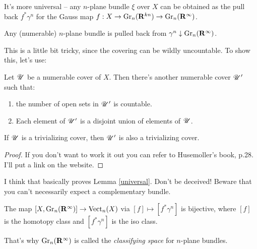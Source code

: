 It's more universal -- any $n$-plane bundle $\xi$ over $X$ can be obtained as the pull back $f^\ast\gamma^n$ for the Gauss map $f:X\to\mathrm{Gr}_n(\mathbf R^{kn})\to\mathrm{Gr}_n(\mathbf R^\infty)$.
\begin{lemma}\label{universal}
    Any (numerable) $n$-plane bundle is pulled back from $\gamma^n\downarrow \mathrm{Gr}_n(\mathbf R^\infty)$.
\end{lemma}
This is a little bit tricky, since the covering can be wildly uncountable. To show this, let's use:
\begin{lemma}\label{sublemma}
    Let $\mathscr U$ be a numerable cover of $X$. Then there's another numerable cover $\mathscr U^\prime$ such that:
    \begin{enumerate}
	\item the number of open sets in $\mathscr U^\prime$ is countable.
	\item Each element of $\mathscr U^\prime$ is a disjoint union of elements of $\mathscr U$.
    \end{enumerate}
\end{lemma}
If $\mathscr U$ is a trivializing cover, then $\mathscr U^\prime$ is also a trivializing cover.
\begin{proof}
    If you don't want to work it out you can refer to Husemoller's book, p.28. I'll put a link on the website.
\end{proof}
I think that basically proves Lemma \ref{universal}. Don't be deceived! Beware that you can't necessarily expect a complementary bundle.
\begin{theorem}
    The map $[X,\mathrm{Gr}_n(\mathbf R^\infty)]\to \operatorname{Vect}_n(X)$ via $[f]\mapsto [f^\ast\gamma^n]$ is bijective, where $[f]$ is the homotopy class and $[f^\ast\gamma^n]$ is the iso class.
\end{theorem}
That's why $\mathrm{Gr}_n(\mathbf R^\infty)$ is called the \emph{classifying space} for $n$-plane bundles.

